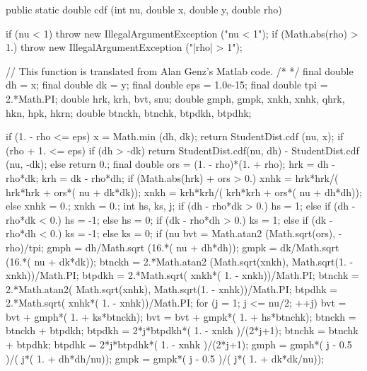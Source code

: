 \begin{code}

   public static double cdf (int nu, double x, double y, double rho) \begin{hide} {
      if (nu < 1)
         throw new IllegalArgumentException ("nu < 1");
      if (Math.abs(rho) > 1.)
         throw new IllegalArgumentException ("|rho| > 1");

// This function is translated from Alan Genz's Matlab code.
/*
%
%
%
%
*/
      final double dh = x;
      final double dk = y;
      final double eps = 1.0e-15;
      final double tpi = 2.*Math.PI;
      double hrk, krh, bvt, snu;
      double gmph, gmpk, xnkh, xnhk, qhrk, hkn, hpk, hkrn;
      double btnckh, btnchk, btpdkh, btpdhk;

      if (1. - rho <= eps) {
         x = Math.min (dh, dk);
         return StudentDist.cdf (nu, x);
      }
      if (rho + 1. <= eps) {
         if (dh > -dk)
            return StudentDist.cdf(nu, dh) - StudentDist.cdf (nu, -dk);
         else
            return 0.;
      }
      final double ors = (1. - rho)*(1. + rho);
      hrk = dh - rho*dk; krh = dk - rho*dh;
      if (Math.abs(hrk) + ors > 0.) {
        xnhk = hrk*hrk/( hrk*hrk + ors*( nu + dk*dk));
        xnkh = krh*krh/( krh*krh + ors*( nu + dh*dh));
      } else {
        xnhk = 0.;
        xnkh = 0.;
      }
      int hs, ks, j;
      if (dh - rho*dk > 0.)
         hs = 1;
      else if (dh - rho*dk < 0.)
         hs = -1;
      else
         hs = 0;
      if (dk - rho*dh > 0.)
         ks = 1;
      else if (dk - rho*dh < 0.)
         ks = -1;
      else
         ks = 0;
      if (nu %
         bvt = Math.atan2 (Math.sqrt(ors), -rho)/tpi;
         gmph = dh/Math.sqrt (16.*( nu + dh*dh));
         gmpk = dk/Math.sqrt (16.*( nu + dk*dk));
         btnckh = 2.*Math.atan2 (Math.sqrt(xnkh), Math.sqrt(1. - xnkh))/Math.PI;
         btpdkh = 2.*Math.sqrt( xnkh*( 1. - xnkh))/Math.PI;
         btnchk = 2.*Math.atan2( Math.sqrt(xnhk), Math.sqrt(1. - xnhk))/Math.PI;
         btpdhk = 2.*Math.sqrt( xnhk*( 1. - xnhk))/Math.PI;
         for (j = 1; j <= nu/2; ++j) {
            bvt = bvt + gmph*( 1. + ks*btnckh);
            bvt = bvt + gmpk*( 1. + hs*btnchk);
            btnckh = btnckh + btpdkh;
            btpdkh = 2*j*btpdkh*( 1. - xnkh )/(2*j+1);
            btnchk = btnchk + btpdhk;
            btpdhk = 2*j*btpdhk*( 1. - xnhk )/(2*j+1);
            gmph = gmph*( j - 0.5 )/( j*( 1. + dh*dh/nu));
            gmpk = gmpk*( j - 0.5 )/( j*( 1. + dk*dk/nu));
         }

}
\end{hide}
\end{code}
